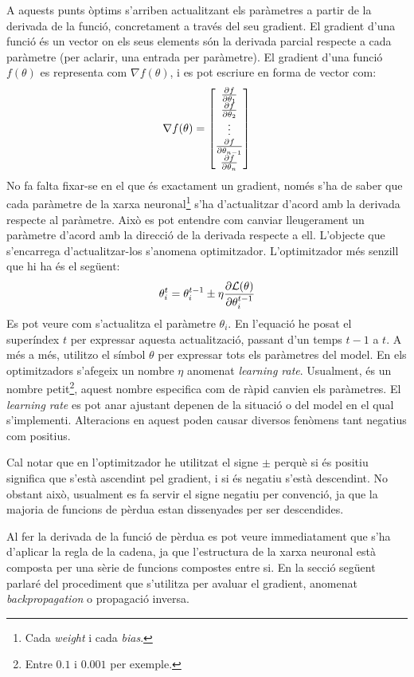 A aquests punts òptims s'arriben actualitzant els paràmetres a partir de la derivada de la funció, concretament a través del seu gradient. El gradient d'una funció és un vector on els seus elements són la derivada parcial respecte a cada paràmetre (per aclarir, una entrada per paràmetre). El gradient d'una funció $f(\theta)$ es representa com $\nabla f(\theta)$, i es pot escriure en forma de vector com:
$$
\nabla f(\theta) = \begin{bmatrix}
	\pdv{f}{\theta_1} \\
	\pdv{f}{\theta_2} \\
	\vdots \\
	\pdv{f}{\theta_{n-1}} \\
	\pdv{f}{\theta_{n}}
\end{bmatrix}
$$
No fa falta fixar-se en el que és exactament un gradient, només s'ha de saber que cada paràmetre de la xarxa neuronal\footnote{Cada \textit{weight} i cada \textit{bias}.} s'ha d'actualitzar d'acord amb la derivada respecte al paràmetre. Això es pot entendre com canviar lleugerament un paràmetre d'acord amb la direcció de la derivada respecte a ell. L'objecte que s'encarrega d'actualitzar-los s'anomena optimitzador. L'optimitzador més senzill que hi ha és el següent:
\begin{equation}
	\theta_{i}^t = \theta_{i}^{t-1} \pm \eta\pdv{\mathcal{L}(\theta)}{\theta_{i}^{t-1}}
	\label{eq:optimizator}
\end{equation}
Es pot veure com s'actualitza el paràmetre $\theta_i$. En l'equació he posat el superíndex $t$ per expressar aquesta actualització, passant d'un temps $t-1$ a $t$. A més a més, utilitzo el símbol $\theta$ per expressar tots els paràmetres del model. En els optimitzadors s'afegeix un nombre $\eta$ anomenat \textit{learning rate}. Usualment, és un nombre petit\footnote{Entre $0.1$ i $0.001$ per exemple.}, aquest nombre especifica com de ràpid canvien els paràmetres. El \textit{learning rate} es pot anar ajustant depenen de la situació o del model en el qual s'implementi. Alteracions en aquest poden causar diversos fenòmens tant negatius com positius.

Cal notar que en l'optimitzador he utilitzat el signe $\pm$ perquè si és positiu significa que s'està ascendint pel gradient, i si és negatiu s'està descendint. No obstant això, usualment es fa servir el signe negatiu per convenció, ja que la majoria de funcions de pèrdua estan dissenyades per ser descendides.

Al fer la derivada de la funció de pèrdua es pot veure immediatament que s'ha d'aplicar la regla de la cadena, ja que l'estructura de la xarxa neuronal està composta per una sèrie de funcions compostes entre si. En la secció següent parlaré del procediment que s'utilitza per avaluar el gradient, anomenat \textit{backpropagation} o propagació inversa.

